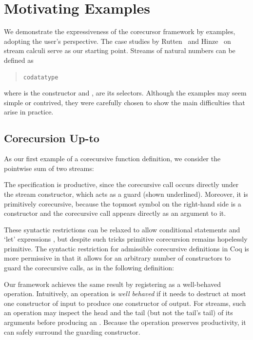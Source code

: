 \documentclass[preprint,draft]
{sigplanconf}
\newcommand\keyw[1]{\texttt{#1}}
\newcommand{\<}{\langle}
\renewcommand{\>}{\rangle}
\begin{document}
\section{Motivating Examples}
\label{sec-exa}







We demonstrate the expressiveness of the corecursor framework by
examples, adopting the user's perspective. The case studies by
Rutten~\cite{rutten05} and Hinze~\cite{hinze10} on stream calculi serve as
our starting point. Streams of natural numbers can be defined as
\begin{quote}
  \keyw{codatatype} \,  
\end{quote}
where  is the constructor and ,  are its selectors.
Although the examples may seem simple or contrived, they were carefully
chosen to show the main difficulties that arise in practice.

\subsection{Corecursion Up-to}
\label{sec-uptoExa}

As our first example of a corecursive function definition,
we consider the pointwise sum of two streams:
\begin{quote}
  
\end{quote}
The specification is productive, since the corecursive call occurs directly
under the stream constructor, which acts as a guard (shown underlined).
Moreover, it is primitively corecursive, because the topmost symbol on the
right-hand side is a constructor and the corecursive call
appears directly as an argument to it.

These syntactic restrictions can be relaxed to allow conditional statements
and `let' expressions \cite{blanchette-et-al-2014-impl}, but despite
such tricks primitive corecursion remains hopelessly primitive.
The syntactic restriction for admissible corecursive definitions in Coq is more
permissive in that it allows for an arbitrary number of constructors to guard
the corecursive calls, as in the following definition:
\begin{quote}

\end{quote}

Our framework achieves the same result by registering  as a
well-behaved operation. Intuitively, an operation is \emph{well behaved} if it
needs to destruct at most one constructor of input to produce one
constructor of output.
For streams, such an operation may inspect the head and the tail
(but not the tail's tail) of its arguments before producing an .
Because the operation preserves productivity, it can safely
surround the guarding constructor.
\end{document}
